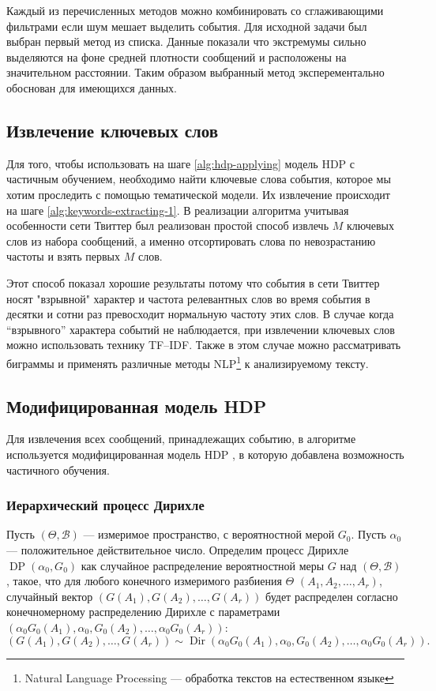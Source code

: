 \documentclass[12pt, a4paper]{article}
\DeclareMathOperator{\Dir}{Dir}
\DeclareMathOperator{\DP}{DP}
\begin{document}
  Каждый из перечисленных методов можно комбинировать со сглаживающими фильтрами если шум мешает выделить события.
  Для исходной задачи был выбран первый метод из списка. Данные показали что экстремумы сильно выделяются на фоне средней плотности сообщений и расположены на значительном расстоянии. Таким образом выбранный метод эксперементально обоснован для имеющихся данных.
  
  \subsection{Извлечение ключевых слов}
  Для того, чтобы использовать на шаге \ref{alg:hdp-applying} модель HDP с частичным обучением, необходимо найти ключевые слова события, которое мы хотим проследить с помощью тематической модели. Их извлечение происходит на шаге \ref{alg:keywords-extracting-1}. В реализации алгоритма учитывая особенности сети Твиттер был реализован простой способ извлечь $M$ ключевых слов из набора сообщений, а именно отсортировать слова по невозрастанию частоты и взять первых $M$ слов.
  
  Этот способ показал хорошие результаты потому что события в сети Твиттер носят "взрывной" характер и частота релевантных слов во время события в десятки и сотни раз превосходит нормальную частоту этих слов. В случае когда ``взрывного'' характера событий не наблюдается, при извлечении ключевых слов можно использовать технику TF--IDF. Также в этом случае можно рассматривать биграммы и применять различные методы NLP\footnote{Natural Language Processing --- обработка текстов на естественном языке} к анализируемому тексту.
  
  \subsection{Модифицированная модель HDP}
  Для извлечения всех сообщений, принадлежащих событию, в алгоритме используется модифицированная модель HDP , в которую добавлена возможность частичного обучения.
  
  \subsubsection{Иерархический процесс Дирихле}
  Пусть $(\Theta, \mathcal{B})$ --- измеримое пространство, с вероятностной мерой $G_0$. Пусть $\alpha_0$ --- положительное действительное число. Определим процесс Дирихле $\DP(\alpha_0, G_0)$ как случайное распределение вероятностной меры $G$ над $(\Theta, \mathcal{B})$, такое, что для любого конечного измеримого разбиения $\Theta$ $(A_1, A_2, \ldots, A_r)$, случайный вектор $(G(A_1), G(A_2), \ldots, G(A_r))$ будет распределен согласно конечномерному распределению Дирихле с параметрами $(\alpha_0 G_0(A_1), \alpha_0, G_0(A_2), \ldots, \alpha_0 G_0 (A_r))$:
  \begin{equation}
  (G(A_1), G(A_2), \ldots, G(A_r)) \sim \Dir(\alpha_0 G_0(A_1), \alpha_0, G_0(A_2), \ldots, \alpha_0 G_0 (A_r)).
  \end{equation}
  
\end{document}
